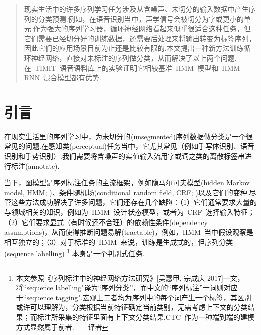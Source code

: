 \documentclass{ctexart}
\begin{document}
 


\begin{abstract} 
现实生活中的许多序列学习任务涉及从含噪声、未切分的输入数据中产生序列的分类预测.例如，在语音识别当中，声学信号会被切分为字或更小的单元.作为强大的序列学习器，循环神经网络看起来似乎很适合这种任务，但它们需要已经切分好的训练数据，还需要后处理来将输出转变为标签序列，因此它们的应用场景目前为止还是比较有限的.本文提出一种新方法训练循环神经网络，直接对未标注的序列做分类，从而解决了以上两个问题.在~TIMIT~语音语料库上的实验证明它相较基准~HMM~模型和~HMM-RNN~混合模型都有优势.
\end{abstract} 

\section{引言}
\label{sec:intro}
在现实生活里的序列学习中，为未切分的(unsegmented)序列数据做分类是一个很常见的问题.在感知类(perceptual)任务当中，它尤其常见（例如手写体识别、语音识别和手势识别）.我们需要将含噪声的实值输入流用字或词之类的离散标签串进行标注(annotate).

当下，图模型是序列标注任务的主流框架，例如隐马尔可夫模型(hidden Markov model, HMM; \citealp{rabiner1989tutorial})、条件随机场(conditional random field, CRF; \citealp{lafferty2001conditional})以及它们的变种.尽管这些方法成功解决了许多问题，它们还存在几个缺陷：（1）它们通常要求大量的与领域相关的知识，例如为~HMM~设计状态模型，或者为~CRF~选择输入特征；（2）它们要求显式（有时候还不合理）的依赖性条件(dependency assumptions)，从而使得推断问题易解(tractable)，例如，HMM~当中假设观察是相互独立的；（3）对于标准的~HMM~来说，训练是生成式的，但序列分类(sequence labelling)
\footnote{本文参照《序列标注中的神经网络方法研究》[吴惠甲, 宗成庆 2017]一文，将``sequence labelling"译为“序列分类”，而中文的“序列标注”一词则对应于``sequence tagging".宏观上二者均为序列中的每个词产生一个标签，其区别或许可以理解为，分类根据当前特征确定当前类别，无需考虑上下文的分类结果；而标注所采集的特征里面有上下文分类结果.CTC~作为一种端到端的建模方式显然属于前者.——译者}
本身是一个判别式任务.
\end{document}
